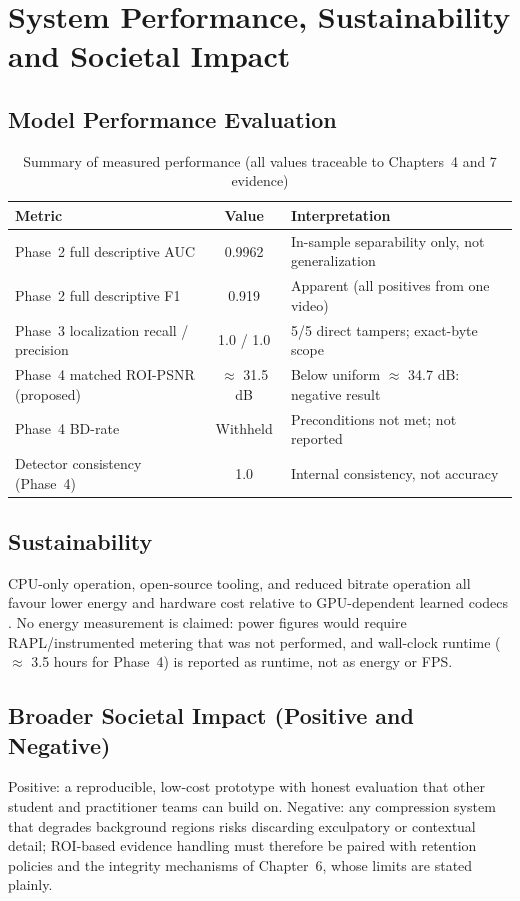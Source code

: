 \section{System Performance, Sustainability and Societal Impact}

\subsection{Model Performance Evaluation}

\begin{table}[H]
\centering
\label{tab:performance_metrics}
\begin{tabular}{|l|c|l|}
\hline
\textbf{Metric} & \textbf{Value} & \textbf{Interpretation} \\
\hline
Phase~2 full descriptive AUC & 0.9962 & In-sample separability only, not generalization \\
Phase~2 full descriptive F1 & 0.919 & Apparent (all positives from one video) \\
Phase~3 localization recall / precision & 1.0 / 1.0 & 5/5 direct tampers; exact-byte scope \\
Phase~4 matched ROI-PSNR (proposed) & $\approx$ 31.5 dB & Below uniform $\approx$ 34.7 dB: negative result \\
Phase~4 BD-rate & Withheld & Preconditions not met; not reported \\
Detector consistency (Phase~4) & 1.0 & Internal consistency, not accuracy \\
\hline
\end{tabular}
\caption{Summary of measured performance (all values traceable to Chapters~4 and 7 evidence)}
\end{table}

\subsection{Sustainability}

CPU-only operation, open-source tooling, and reduced bitrate operation all favour lower energy and hardware cost relative to GPU-dependent learned codecs \cite{Wu2024ROIDVC,Zhao2025ASVC}. No energy measurement is claimed: power figures would require RAPL/instrumented metering that was not performed, and wall-clock runtime ($\approx$ 3.5 hours for Phase~4) is reported as runtime, not as energy or FPS.

\subsection{Broader Societal Impact (Positive and Negative)}

Positive: a reproducible, low-cost prototype with honest evaluation that other student and practitioner teams can build on. Negative: any compression system that degrades background regions risks discarding exculpatory or contextual detail; ROI-based evidence handling must therefore be paired with retention policies and the integrity mechanisms of Chapter~6, whose limits are stated plainly.
